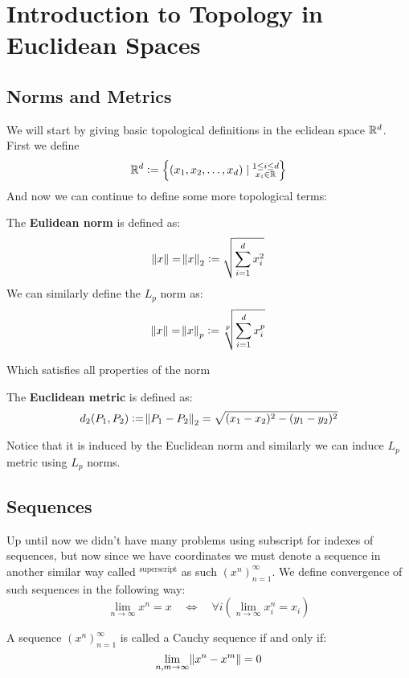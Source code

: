 \documentclass[11pt,a4paper]{article}
\begin{document}
	\maketitle


  \newpage
  \tableofcontents
	\newpage

	\section{Introduction to Topology in Euclidean Spaces}
	\subsection{Norms and Metrics}
  We will start by giving basic topological definitions in the eclidean
	space $\mathbb{R}^d$. First we define
	\[
		\mathbb{R}^d := \set{(x_1,x_2,\dots,x_d) \mid \substack{1 \le i \le d \\ x_i\in\mathbb{R}}}
	\]
	And now we can continue to define some more topological terms:
	\begin{definition}
	The \textbf{Eulidean norm} is defined as:
	\[
    \norm{x} = \norm{x}_2 := \sqrt{\sum_{i=1}^{d}{x_i^2}}
	\]
	We can similarly define the $L_p$ norm as:
	\[
    \norm{x} = \norm{x}_p := \sqrt[p]{\sum_{i=1}^{d}{x_i^p}}
	\]
	\end{definition}
	\noindent Which satisfies all properties of the norm
	\begin{definition}
	The \textbf{Euclidean metric} is defined as:
	\[
    d_2(P_1,P_2) := \norm{P_1-P_2}_2 = \sqrt{(x_1-x_2)^2 - (y_1-y_2)^2}
	\]
	\end{definition}
	\noindent Notice that it is induced by the Euclidean norm and similarly
	we can induce $L_p$ metric using $L_p$ norms.
	\subsection{Sequences}
	Up until now we didn't have many problems using subscript for indexes
	of sequences, but now since we have coordinates we must denote a sequence
	in another similar way called $^{\text{superscript}}$ as such 
  $(x^n)_{n=1}^{\infty}$. We define convergence of such sequences in
  the following way:
	\[
		\lim_{n\to\infty}{x^n} = x 
		\quad \iff \quad
		\forall i\left(\lim_{n\to\infty}{x_i^n} = x_i\right)
	\]
	\begin{definition}
	A sequence $(x^n)_{n=1}^{\infty}$ is called a Cauchy sequence if and only 
	if:
	\[
    \lim_{n,m \to \infty}{\norm{x^n - x^m}} = 0
	\]
	\end{definition}
	
\end{document}
